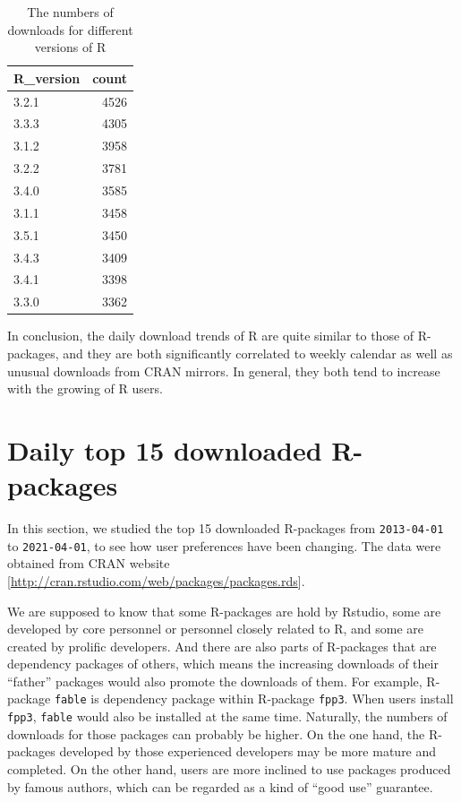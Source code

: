 \documentclass[
]{book}
\begin{document}
\begin{table}

\caption{\label{tab:R-download-trend-version}The numbers of downloads for different versions of R}
\centering
\begin{tabular}[t]{l|r}
\hline
R\_version & count\\
\hline
3.2.1 & 4526\\
\hline
3.3.3 & 4305\\
\hline
3.1.2 & 3958\\
\hline
3.2.2 & 3781\\
\hline
3.4.0 & 3585\\
\hline
3.1.1 & 3458\\
\hline
3.5.1 & 3450\\
\hline
3.4.3 & 3409\\
\hline
3.4.1 & 3398\\
\hline
3.3.0 & 3362\\
\hline
\end{tabular}
\end{table}

In conclusion, the daily download trends of R are quite similar to those of R-packages, and they are both significantly correlated to weekly calendar as well as unusual downloads from CRAN mirrors. In general, they both tend to increase with the growing of R users.

\hypertarget{daily-top-15-downloaded-r-packages}{%
\section{Daily top 15 downloaded R-packages}\label{daily-top-15-downloaded-r-packages}}

In this section, we studied the top 15 downloaded R-packages from \texttt{2013-04-01} to \texttt{2021-04-01}, to see how user preferences have been changing. The data were obtained from CRAN website {[}\url{http://cran.rstudio.com/web/packages/packages.rds}{]}.

We are supposed to know that some R-packages are hold by Rstudio, some are developed by core personnel or personnel closely related to R, and some are created by prolific developers\citep{revolutions}. And there are also parts of R-packages that are dependency packages of others, which means the increasing downloads of their ``father'' packages would also promote the downloads of them. For example, R-package \texttt{fable} is dependency package within R-package \texttt{fpp3}. When users install \texttt{fpp3}, \texttt{fable} would also be installed at the same time. Naturally, the numbers of downloads for those packages can probably be higher. On the one hand, the R-packages developed by those experienced developers may be more mature and completed. On the other hand, users are more inclined to use packages produced by famous authors, which can be regarded as a kind of ``good use'' guarantee.
\end{document}
